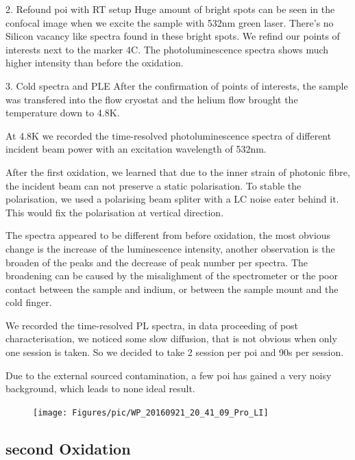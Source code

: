 2. Refound poi with RT setup
Huge amount of bright spots can be seen in the confocal image when we excite the sample with 532nm green laser. There's no Silicon vacancy like spectra found in these bright spots. We refind our points of interests next to the marker 4C. The photoluminescence spectra shows much higher intensity than before the oxidation.


3. Cold spectra and PLE 
After the confirmation of points of interests, the sample was transfered into the flow cryostat and the helium flow brought the temperature down to 4.8K.

At 4.8K we recorded the time-resolved photoluminescence spectra of different incident beam power with an excitation wavelength of 532nm. 

After the first oxidation, we learned that due to the inner strain of photonic fibre, the incident beam can not preserve a static polarisation. To stable the polarisation, we used a polarising beam spliter with a LC noise eater behind it. This would fix the polarisation at vertical direction.

The spectra appeared to be different from before oxidation, the most obvious change is the increase of the luminescence intensity, another observation is the broaden of the peaks and the decrease of peak number per spectra. The broadening can be caused by the misalighment of the spectrometer or the poor contact between the sample and indium, or between the sample mount and the cold finger. 

We recorded the time-resolved PL spectra, in data proceeding of post characterisation, we noticed some slow diffusion, that is not obvious when only one session is taken. So we decided to take 2 session per poi and 90s per session.

Due to the external sourced contamination, a few poi has gained a very noisy background, which leads to none ideal result.






\FloatBarrier
\begin{figure}[h]
\centering
\texttt{[image: Figures/pic/WP\_20160921\_20\_41\_09\_Pro\_LI]}
\caption{}
\label{fig:wp20160921204109proli}
\end{figure}
\FloatBarrier

\subsection[Second Oxidation]{second Oxidation}

